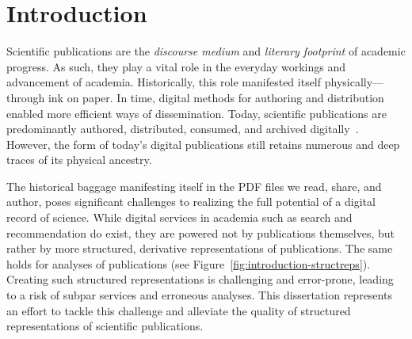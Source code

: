 \chapter{Introduction}
\label{chp:introduction}


Scientific publications are the \emph{discourse medium} and \emph{literary footprint} of academic progress. As such, they play a vital role in the everyday workings and advancement of academia.
Historically, this role manifested itself physically---through ink on paper. In time, digital methods for authoring %
and distribution enabled more efficient ways of dissemination.
Today, scientific publications are predominantly authored, distributed, consumed, and archived digitally~\cite{Lamers2018}. However, the form of today's digital publications still retains numerous and deep traces of its physical ancestry.




The historical baggage manifesting itself in the PDF files we read, share, and author, poses significant challenges to realizing the full potential of a digital record of science. While digital services in academia such as search and recommendation do exist, they are powered not by publications themselves, but rather by more structured, derivative representations of publications. The same holds for analyses of publications (see Figure~\ref{fig:introduction-structreps}). Creating such structured representations %
is challenging and error-prone, leading to a risk of subpar services and erroneous analyses. This dissertation represents an effort to tackle this challenge and alleviate the quality of structured representations of scientific publications.

